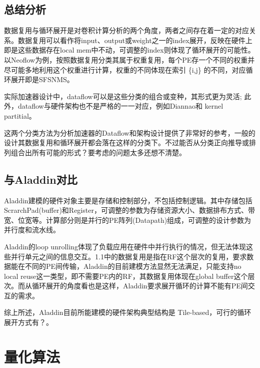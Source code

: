 \documentclass[UTF8]{scrartcl}
\begin{document}
	      
	  \subsection{总结分析}
			  			  
		数据复用与循环展开是对卷积计算分析的两个角度，两者之间存在着一定的对应关系。数据复用可以看作将input、output或weight之一的index展开，反映在硬件上即是这些数据存在local mem中不动，可调整的index则体现了循环展开的可能性。以Neoflow为例，按照数据复用分类其属于权重复用，每个PE存一个不同的权重并尽可能多地利用这个权重进行计算，权重的不同体现在索引 \{i,j\} 的不同，对应循环展开即是SFSNMS。
		
		实际加速器设计中，dataflow可以是这些分类的组合或变种，其形式更为灵活\cite{flexflow}; 此外，dataflow与硬件架构也不是严格的一一对应，例如Diannao和 kernel partitia\cite{c-brain}l。
		
		这两个分类方法为分析加速器的Dataflow和架构设计提供了非常好的参考，一般的设计其数据复用和循环展开都会落在这样的分类下。不过能否从分类正向推导或排列组合出所有可能的形式？要考虑的问题太多还想不清楚。

	   
	 
	  \subsection{与Aladdin对比}
       Aladdin建模的硬件对象主要是存储和控制部分，不包括控制逻辑。其中存储包括ScrarchPad(buffer)和Register，可调整的参数为存储资源大小、数据排布方式、带宽、位宽等。计算部分则是并行的PE阵列(Datapath)组成，可调整的设计参数为并行度和流水线。
       
       
       Aladdin的loop unrolling体现了负载应用在硬件中并行执行的情况，但无法体现这些并行单元之间的信息交互。1.1中的数据复用是指在RF这个层次的复用，要求数据能在不同的PE间传输，Aladdin的目前建模方法显然无法满足，只能支持no local reuse这一类型，即不需要PE内的RF，其数据复用体现在global buffer这个层次。而从循环展开的角度看也是这样，Aladdin要求展开循环的计算不能有PE间交互的需求。
       
        综上所述，Aladdin目前所能建模的硬件架构典型结构是 Tile-based，可行的循环展开方式有？。
  
  \section{量化算法}
  
\end{document}
